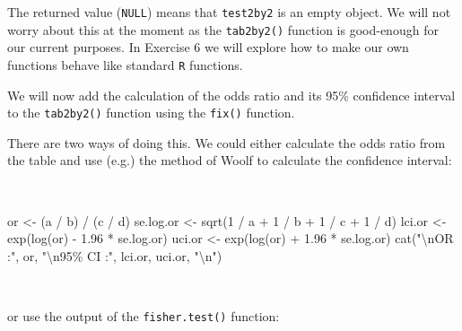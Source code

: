 \documentclass[
  12pt,
  a4paper]{book}
\newenvironment{Shaded}{\begin{snugshade}}{\end{snugshade}}
\newcommand{\DecValTok}[1]{\textcolor[rgb]{0.00,0.00,0.81}{#1}}
\newcommand{\FloatTok}[1]{\textcolor[rgb]{0.00,0.00,0.81}{#1}}
\newcommand{\FunctionTok}[1]{\textcolor[rgb]{0.00,0.00,0.00}{#1}}
\newcommand{\NormalTok}[1]{#1}
\newcommand{\OtherTok}[1]{\textcolor[rgb]{0.56,0.35,0.01}{#1}}
\newcommand{\SpecialCharTok}[1]{\textcolor[rgb]{0.00,0.00,0.00}{#1}}
\newcommand{\StringTok}[1]{\textcolor[rgb]{0.31,0.60,0.02}{#1}}
\begin{document}
\newpage

The returned value (\texttt{NULL}) means that \texttt{test2by2} is an empty object. We will not worry about this at the moment as the \texttt{tab2by2()} function is good-enough for our current purposes. In Exercise 6 we will explore how to make our own functions behave like standard \texttt{R} functions.

We will now add the calculation of the odds ratio and its 95\% confidence interval to the \texttt{tab2by2()} function using the \texttt{fix()} function.

There are two ways of doing this. We could either calculate the odds ratio from the table and use (e.g.) the method of Woolf to calculate the confidence interval:

~

\begin{Shaded}
\begin{Highlighting}[]
\NormalTok{or }\OtherTok{\textless{}{-}}\NormalTok{ (a }\SpecialCharTok{/}\NormalTok{ b) }\SpecialCharTok{/}\NormalTok{ (c }\SpecialCharTok{/}\NormalTok{ d)}
\NormalTok{se.log.or }\OtherTok{\textless{}{-}} \FunctionTok{sqrt}\NormalTok{(}\DecValTok{1} \SpecialCharTok{/}\NormalTok{ a }\SpecialCharTok{+} \DecValTok{1} \SpecialCharTok{/}\NormalTok{ b }\SpecialCharTok{+} \DecValTok{1} \SpecialCharTok{/}\NormalTok{ c }\SpecialCharTok{+} \DecValTok{1} \SpecialCharTok{/}\NormalTok{ d)}
\NormalTok{lci.or }\OtherTok{\textless{}{-}} \FunctionTok{exp}\NormalTok{(}\FunctionTok{log}\NormalTok{(or) }\SpecialCharTok{{-}} \FloatTok{1.96} \SpecialCharTok{*}\NormalTok{ se.log.or)}
\NormalTok{uci.or }\OtherTok{\textless{}{-}} \FunctionTok{exp}\NormalTok{(}\FunctionTok{log}\NormalTok{(or) }\SpecialCharTok{+} \FloatTok{1.96} \SpecialCharTok{*}\NormalTok{ se.log.or)}
\FunctionTok{cat}\NormalTok{(}\StringTok{"}\SpecialCharTok{\textbackslash{}n}\StringTok{OR     :"}\NormalTok{, or,}
    \StringTok{"}\SpecialCharTok{\textbackslash{}n}\StringTok{95\% CI :"}\NormalTok{, lci.or, uci.or, }\StringTok{"}\SpecialCharTok{\textbackslash{}n}\StringTok{"}\NormalTok{)}
\end{Highlighting}
\end{Shaded}

~

or use the output of the \texttt{fisher.test()} function:

~

\begin{Shaded}
\end{Shaded}
\end{document}
